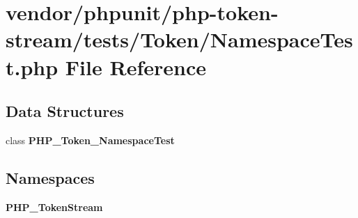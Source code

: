 \section{vendor/phpunit/php-\/token-\/stream/tests/\+Token/\+Namespace\+Test.php File Reference}
\label{phpunit_2php-token-stream_2tests_2_token_2_namespace_test_8php}
\subsection*{Data Structures}
\begin{DoxyCompactItemize}
\item 
class {\bf P\+H\+P\+\_\+\+Token\+\_\+\+Namespace\+Test}
\end{DoxyCompactItemize}
\subsection*{Namespaces}
\begin{DoxyCompactItemize}
\item 
 {\bf P\+H\+P\+\_\+\+Token\+Stream}
\end{DoxyCompactItemize}
